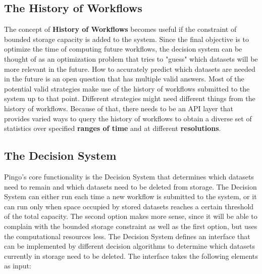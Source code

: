 \subsection{The History of Workflows}
The concept of \textbf{History of Workflows} becomes useful if the constraint of bounded storage capacity is added to the system. Since the final objective is to optimize the time of computing future workflows, the decision system can be thought of as an optimization problem that tries to "guess" which datasets will be more relevant in the future. How to accurately predict which datasets are needed in the future is an open question that has multiple valid answers. Most of the potential valid strategies make use of the history of workflows submitted to the system up to that point.  Different strategies might need different things from the history of workflows. Because of that, there needs to be an API layer that provides varied ways to query the history of workflows to obtain a diverse set of statistics over specified \textbf{ranges of time} and at different \textbf{resolutions}.

\subsection{The Decision System}
\label{sec:decision_system}
Pingo's core functionality is the Decision System that determines which datasets need to remain and which datasets need to be deleted from storage.  The Decision System can either run each time a new workflow is submitted to the system, or it can run only when space occupied by stored datasets reaches a certain threshold of the total capacity.  The second option makes more sense, since it will be able to complain with the bounded storage constraint as well as the first option, but uses the computational resources less. The Decision System defines an interface that can be implemented by different decision algorithms to determine which datasets currently in storage need to be deleted. The interface takes the following elements as input:

